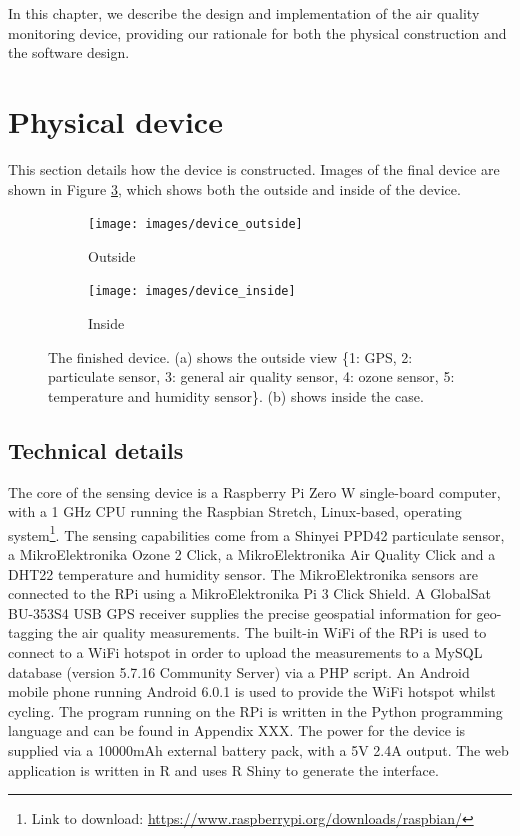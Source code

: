\documentclass[11pt,twosided,a4paper]{report}
\begin{document}
In this chapter, we describe the design and implementation of the air quality monitoring device, providing our rationale for both the physical construction and the software design.

\section{Physical device}

This section details how the device is constructed. Images of the final device are shown in Figure \ref{device}, which shows both the outside and inside of the device.

\begin{figure}[!htb]
\centering
\begin{subfigure}{.5\textwidth}
  \centering
  \texttt{[image: images/device\_outside]}
  \caption{Outside}
  \label{fig:outside}
\end{subfigure}%
\begin{subfigure}{.5\textwidth}
  \centering
  \texttt{[image: images/device\_inside]}
  \caption{Inside}
  \label{fig:inside}
\end{subfigure}
\caption[Finished device.]{The finished device. (a) shows the outside view \{1: GPS, 2: particulate sensor, 3: general air quality sensor, 4: ozone sensor, 5: temperature and humidity sensor\}. (b) shows inside the case.}
\label{device}
\end{figure}



\subsection{Technical details}

The core of the sensing device is a Raspberry Pi Zero W single-board computer, with a 1 GHz CPU running the Raspbian Stretch, Linux-based, operating system\footnote{Link to download: \href{https://www.raspberrypi.org/downloads/raspbian/}{https://www.raspberrypi.org/downloads/raspbian/}}. The sensing capabilities come from a Shinyei PPD42 particulate sensor, a MikroElektronika Ozone 2 Click, a MikroElektronika Air Quality Click and a DHT22 temperature and humidity sensor. The MikroElektronika sensors are connected to the RPi using a MikroElektronika Pi 3 Click Shield. A GlobalSat BU-353S4 USB GPS receiver supplies the precise geospatial information for geo-tagging the air quality measurements. The built-in WiFi of the RPi is used to connect to a WiFi hotspot in order to upload the measurements to a MySQL database (version 5.7.16 Community Server) via a PHP script. An Android mobile phone running Android 6.0.1 is used to provide the WiFi hotspot whilst cycling. The program running on the RPi is written in the Python programming language and can be found in Appendix XXX. The power for the device is supplied via a 10000mAh external battery pack, with a 5V 2.4A output. The web application is written in R and uses R Shiny to generate the interface.
\end{document}

